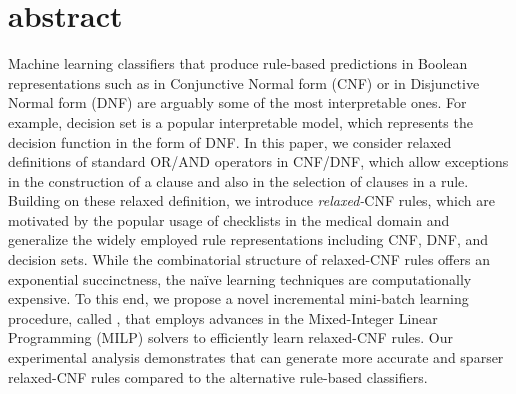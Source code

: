 \section{abstract}
	 Machine learning classifiers that produce  rule-based predictions in Boolean representations such as in Conjunctive Normal form (CNF) or in Disjunctive Normal form (DNF) are arguably some of the most interpretable ones. For example, decision set is a popular interpretable model, which represents the decision function in the form of DNF. In this paper, we consider relaxed definitions of standard OR/AND operators in CNF/DNF, which allow exceptions in the construction of a clause and also in the selection of clauses in a rule. Building on these relaxed definition,  we introduce \textit{relaxed-}CNF rules, which are motivated by the popular usage of checklists in the medical domain and generalize the widely employed rule representations including CNF, DNF, and decision sets.  While the combinatorial structure of relaxed-CNF rules offers an exponential succinctness, the na\"ive learning techniques are computationally expensive. 	 To this end, we  propose a novel incremental mini-batch learning procedure, called {\crr}, that employs  advances in the  Mixed-Integer Linear Programming (MILP) solvers to efficiently learn relaxed-CNF rules. Our  experimental analysis demonstrates that {\crr} can generate more accurate and sparser relaxed-CNF rules compared to the alternative rule-based classifiers. 

\noindent\makebox[\linewidth]{\rule{\paperwidth}{2pt}}

